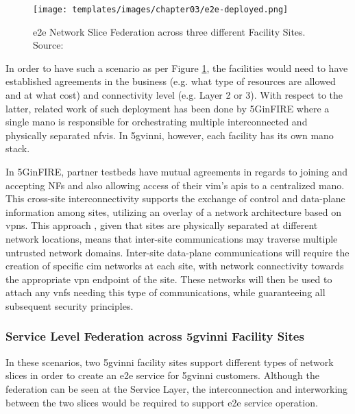     \begin{figure}[!ht]
        \centering
        \texttt{[image: templates/images/chapter03/e2e-deployed.png]}
        \caption{\acrshort{e2e} Network Slice Federation across three different Facility Sites. Source: }
        \label{fig:e2e-deployed}
    \end{figure}
    
    In order to have such a scenario as per Figure \ref{fig:e2e-deployed}, the facilities would need to have established agreements in the business (e.g. what type of resources are allowed and at what cost) and connectivity level (e.g. Layer 2 or 3). With respect to the latter, related work of such deployment has been done by 5GinFIRE \cite{5ginfire} where a single \acrshort{mano} is responsible for orchestrating multiple interconnected and physically separated \acrshort{nfvi}s. In \acrshort{5gvinni}, however, each facility has its own \acrshort{mano} stack. 
    
    In 5GinFIRE, partner testbeds have mutual agreements in regards to joining and accepting NFs and also allowing access of their \acrshort{vim}'s \acrshort{api}s to a centralized \acrshort{mano}. This cross-site interconnectivity supports the exchange of control and data-plane information among sites, utilizing an overlay of a network architecture based on \acrshort{vpn}s. This approach \cite{diego_lopez_2018_732497}, given that sites are physically separated at different network locations, means that inter-site communications may traverse multiple untrusted network domains. Inter-site data-plane communications will require the creation of specific \acrshort{cim} networks at each site, with network connectivity towards the appropriate \acrshort{vpn} endpoint of the site. These networks will then be used to attach any \acrshort{vnf}s needing this type of communications, while guaranteeing all subsequent security principles. 
    
    \subsubsection{Service Level Federation across \acrshort{5gvinni} Facility Sites}
    In these scenarios, two \acrshort{5gvinni} facility sites support different types of network slices in order to create an \acrshort{e2e} service for \acrshort{5gvinni} customers. Although the federation can be seen at the Service Layer, the interconnection and interworking between the two slices would be required to support \acrshort{e2e} service operation.
  

